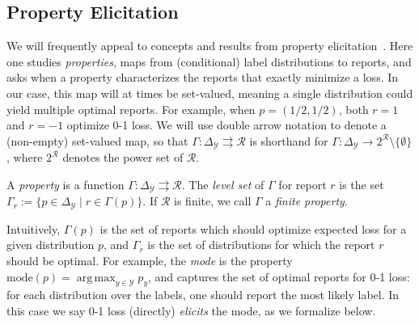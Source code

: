 \documentclass[twoside,11pt]{article}
\newcommand{\Comments}{1}
\newcommand{\mytodo}[2]{\ifnum\Comments=1%
  \todo[linecolor=#1!80!black,backgroundcolor=#1,bordercolor=#1!80!black]{#2}\fi}
\newcommand{\raft}[1]{\mytodo{green!20!white}{RF: #1}}
\newcommand{\jessiet}[1]{\mytodo{teal!20!white}{JF: #1}}
\newcommand{\mode}{\mathrm{mode}}
\newcommand{\simplex}{\Delta_\Y}
\newcommand{\R}{\mathcal{R}}
\newcommand{\Y}{\mathcal{Y}}
\newcommand{\toto}{\rightrightarrows}
\DeclareMathOperator*{\argmax}{arg\,max}
\begin{document}
\subsection{Property Elicitation}
\label{sec:property-elicitation}

We will frequently appeal to concepts and results from property elicitation~\citep{savage1971elicitation,osband1985information-eliciting,lambert2008eliciting,gneiting2011making,steinwart2014elicitation,frongillo2015vector-valued,lambert2018elicitation}.
Here one studies \emph{properties}, maps from (conditional) label distributions to reports, and asks when a property characterizes the reports that exactly minimize a loss.
In our case, this map will at times be set-valued, meaning a single distribution could yield multiple optimal reports.
For example, when $p=(1/2,1/2)$, both $r=1$ and $r=-1$ optimize 0-1 loss.
We will use double arrow notation to denote a (non-empty) set-valued map, so that $\Gamma: \simplex \toto \R$ is shorthand for $\Gamma: \simplex \to 2^{\R} \setminus \{\emptyset\}$, where $2^\R$ denotes the power set of $\R$.

\begin{definition}\label{def:property}
  A \emph{property} is a function $\Gamma:\simplex\toto\R$.
  The \emph{level set} of $\Gamma$ for report $r$ is the set $\Gamma_r := \{p \in \simplex \mid r \in \Gamma(p)\}$.
  If $\R$ is finite, we call $\Gamma$ a \emph{finite property}.
\end{definition}

Intuitively, $\Gamma(p)$ is the set of reports which should optimize expected loss for a given distribution $p$, and $\Gamma_r$ is the set of distributions for which the report $r$ should be optimal.
For example, the \emph{mode} is the %
property $\mode(p) = \argmax_{y\in\Y} p_y$, and captures the set of optimal reports for 0-1 loss: for each distribution over the labels, one should report the most likely label.
In this case we say 0-1 loss (directly) \emph{elicits} the mode, as we formalize below.
\end{document}
